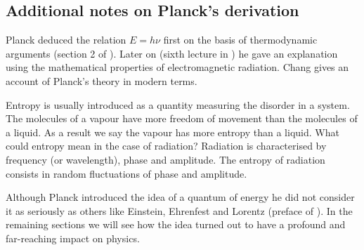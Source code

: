 \subsection{Additional notes on Planck's derivation}
Planck deduced the relation $E = h\nu$ first on the basis of thermodynamic
arguments (section 2 of \cite{planck1901law}). Later on (sixth lecture in 
\cite{planck2012eight}) he gave an explanation using the mathematical 
properties of electromagnetic radiation. Chang \cite{chang2017physical} gives 
an account of Planck's theory in modern terms.

Entropy is usually introduced as a quantity measuring the disorder in a system.
The molecules of a vapour have more freedom of movement than the molecules of a
liquid. As a result we say the vapour has more entropy than a liquid. What could
entropy mean in the case of radiation? Radiation is characterised by frequency 
(or wavelength), phase and amplitude. The entropy of radiation consists in 
random fluctuations of phase and amplitude.

Although Planck introduced the idea of a quantum of energy he did not consider it
as seriously as others like Einstein, Ehrenfest and Lorentz (preface of 
\cite{planck2012eight}). In the remaining sections we will see how the idea 
turned out to have a profound and far-reaching impact on physics.

